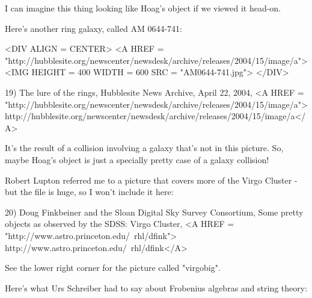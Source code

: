 I can imagine this thing looking like Hoag's object if we viewed
it head-on.  

Here's another ring galaxy,
called AM 0644-741:

<DIV ALIGN = CENTER>
<A HREF = "http://hubblesite.org/newscenter/newsdesk/archive/releases/2004/15/image/a">
<IMG HEIGHT = 400 WIDTH = 600 SRC = "AM0644-741.jpg">
</DIV>

19) The lure of the rings, Hubblesite News Archive, April 22, 2004,
<A HREF = "http://hubblesite.org/newscenter/newsdesk/archive/releases/2004/15/image/a">http://hubblesite.org/newscenter/newsdesk/archive/releases/2004/15/image/a</A>

It's the result of a collision
involving a galaxy that's not in this picture.  So, maybe Hoag's 
object is just a specially pretty case of a galaxy collision!

Robert Lupton referred me to a picture that covers more of the 
Virgo Cluster - but the file is huge, so I won't include it here:

20) Doug Finkbeiner and the Sloan Digital Sky Survey Consortium, 
Some pretty objects as observed by the SDSS: Virgo Cluster, 
<A HREF = "http://www.astro.princeton.edu/~rhl/dfink">
http://www.astro.princeton.edu/~rhl/dfink</A>

See the lower right corner for the picture called "virgobig".

Here's what Urs Schreiber had to say about Frobenius algebras and
string theory:

